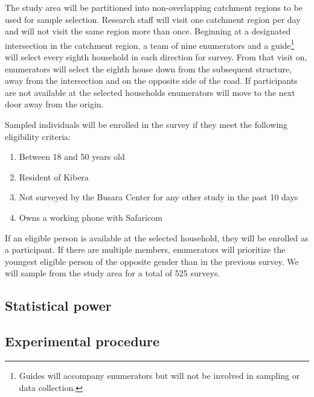 \documentclass[11pt, a4paper]{article}\usepackage[]{graphicx}\usepackage[]{color}
\begin{document}
        The study area will be partitioned into non-overlapping catchment regions to be used for sample selection. Research staff will visit one catchment region per day and will not visit the same region more than once. Beginning at a designated intersection in the catchment region, a team of nine enumerators and a guide\footnote{Guides will accompany enumerators but will not be involved in sampling or data collection.} will select every eighth household in each direction for survey. From that visit on, enumerators will select the eighth house down from the subsequent structure, away from the intersection and on the opposite side of the road. If participants are not available at the selected households enumerators will move to the next door away from the origin.

        Sampled individuals will be enrolled in the survey if they meet the following eligibility criteria:

        \begin{enumerate}
            \item Between 18 and 50 years old
            \item Resident of Kibera
            \item Not surveyed by the Busara Center for any other study in the past 10 days
            \item Owns a working phone with Safaricom
        \end{enumerate}

        If an eligible person is available at the selected household, they will be enrolled as a participant. If there are multiple members, enumerators will prioritize the youngest eligible person of the opposite gender than in the previous survey. We will sample from the study area for a total of 525 surveys.


    \subsection{Statistical power}


    \subsection{Experimental procedure}
\end{document}
